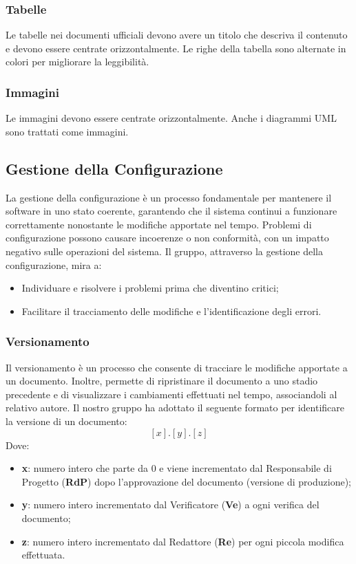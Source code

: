 \subsubsection{Tabelle}
Le tabelle nei documenti ufficiali devono avere un titolo che descriva il contenuto e devono essere centrate orizzontalmente. 
Le righe della tabella sono alternate in colori per migliorare la leggibilità. 

\subsubsection{Immagini}
Le immagini devono essere centrate orizzontalmente. Anche i diagrammi UML sono trattati come immagini.










\subsection{Gestione della Configurazione}
La gestione della configurazione è un processo fondamentale per mantenere il software in uno stato coerente, 
garantendo che il sistema continui a funzionare correttamente nonostante le modifiche apportate nel tempo.
Problemi di configurazione possono causare incoerenze o non conformità, con un impatto negativo sulle operazioni del sistema.
Il gruppo, attraverso la gestione della configurazione, mira a:
\begin{itemize}
    \item Individuare e risolvere i problemi prima che diventino critici;
    \item Facilitare il tracciamento delle modifiche e l’identificazione degli errori.
\end{itemize}

\subsubsection{Versionamento}
Il versionamento è un processo che consente di tracciare le modifiche apportate a un documento. 
Inoltre, permette di ripristinare il documento a uno stadio precedente e di visualizzare i cambiamenti effettuati nel tempo, 
associandoli al relativo autore.
Il nostro gruppo ha adottato il seguente formato per identificare la versione di un documento:  
\[
[x].[y].[z]
\]
Dove:
\begin{itemize}
    \item \textbf{x}: numero intero che parte da 0 e viene incrementato dal Responsabile di Progetto (\textbf{RdP}) dopo l'approvazione del documento (versione di produzione);
    \item \textbf{y}: numero intero incrementato dal Verificatore (\textbf{Ve}) a ogni verifica del documento;
    \item \textbf{z}: numero intero incrementato dal Redattore (\textbf{Re}) per ogni piccola modifica effettuata.
\end{itemize}


